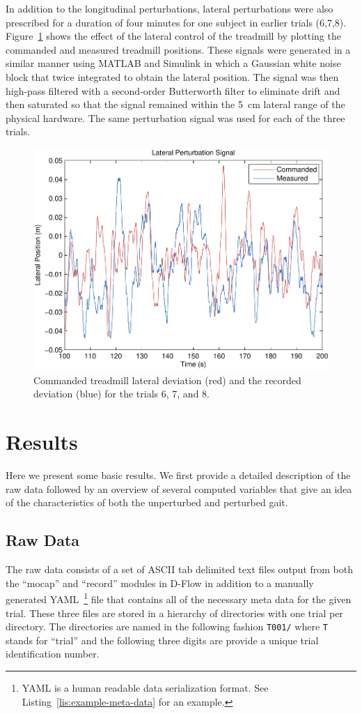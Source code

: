 \documentclass[fleqn,12pt]{wlpeerj}
\begin{document}
In addition to the longitudinal perturbations, lateral perturbations were also
prescribed for a duration of four minutes for one subject in earlier trials
(6,7,8). Figure~\ref{fig:lateral_perturbation} shows the effect of the lateral
control of the treadmill by plotting the commanded and measured treadmill
positions. These signals were generated in a similar manner using MATLAB and
Simulink in which a Gaussian white noise block that twice integrated to obtain
the lateral position. The signal was then high-pass filtered with a
second-order Butterworth filter to eliminate drift and then saturated so that
the signal remained within the 5~\si{\centi\meter} lateral range of the
physical hardware.  The same perturbation signal was used for each of the three
trials.
%
\begin{figure}
  \centering
  \includegraphics{figures/lateral_perturbation.pdf}
  \caption{Commanded treadmill lateral deviation (red) and the recorded
    deviation (blue) for the trials 6, 7, and 8.}
  \label{fig:lateral_perturbation}
\end{figure}

\section*{Results}
%
Here we present some basic results. We first provide a detailed description of
the raw data followed by an overview of several computed variables that give an
idea of the characteristics of both the unperturbed and perturbed gait.

\subsection*{Raw Data}
%
The raw data consists of a set of ASCII tab delimited text files output from
both the ``mocap'' and ``record'' modules in D-Flow in addition to a manually
generated YAML~\footnote{YAML is a human readable data serialization format.
See Listing~\ref{lis:example-meta-data} for an example.} file that contains all
of the necessary meta data for the given trial. These three files are stored
in a hierarchy of directories with one trial per directory. The directories are
named in the following fashion \verb+T001/+ where \verb+T+ stands for ``trial''
and the following three digits are provide a unique trial identification
number.
\end{document}
